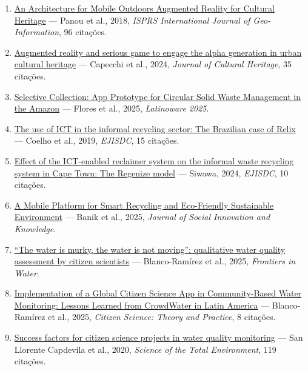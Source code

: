 \documentclass[11pt,a4paper]{article}
\begin{document}
{\begin{enumerate}
\item \href{https://consensus.app/papers/details/832428ca4b86569aa0c4d5fd56ce51e1/}{An Architecture for Mobile Outdoors Augmented Reality for Cultural Heritage} --- Panou et al., 2018, \textit{ISPRS International Journal of Geo-Information}, 96 citações.
\item \href{https://consensus.app/papers/details/598df49fb88c5b0b99f888422b88f243/}{Augmented reality and serious game to engage the alpha generation in urban cultural heritage} --- Capecchi et al., 2024, \textit{Journal of Cultural Heritage}, 35 citações.
\item \href{https://consensus.app/papers/details/66a13f72561658b9b24c7aead237b69d/}{Selective Collection: App Prototype for Circular Solid Waste Management in the Amazon} --- Flores et al., 2025, \textit{Latinoware 2025}.
\item \href{https://consensus.app/papers/details/dbe5bc5261c75b9fa150ce5aa75f7ccb/}{The use of ICT in the informal recycling sector: The Brazilian case of Relix} --- Coelho et al., 2019, \textit{EJISDC}, 15 citações.
\item \href{https://consensus.app/papers/details/4f8a9289f7715672b6b16b70b4695575/}{Effect of the ICT-enabled reclaimer system on the informal waste recycling system in Cape Town: The Regenize model} --- Siwawa, 2024, \textit{EJISDC}, 10 citações.
\item \href{https://consensus.app/papers/details/483ea6b908945b98b7a59f489108400b/}{A Mobile Platform for Smart Recycling and Eco-Friendly Sustainable Environment} --- Banik et al., 2025, \textit{Journal of Social Innovation and Knowledge}.
\item \href{https://consensus.app/papers/details/672f44792cda59b78db8d50d381c8134/}{``The water is murky, the water is not moving'': qualitative water quality assessment by citizen scientists} --- Blanco-Ramírez et al., 2025, \textit{Frontiers in Water}.
\item \href{https://consensus.app/papers/details/ed026e7aa0f251648d9112fcc58da08d/}{Implementation of a Global Citizen Science App in Community-Based Water Monitoring: Lessons Learned from CrowdWater in Latin America} --- Blanco-Ramírez et al., 2025, \textit{Citizen Science: Theory and Practice}, 8 citações.
\item \href{https://consensus.app/papers/details/4f22fe32a8c858848defb1a13455337f/}{Success factors for citizen science projects in water quality monitoring} --- San Llorente Capdevila et al., 2020, \textit{Science of the Total Environment}, 119 citações.

\end{enumerate}}
\end{document}
